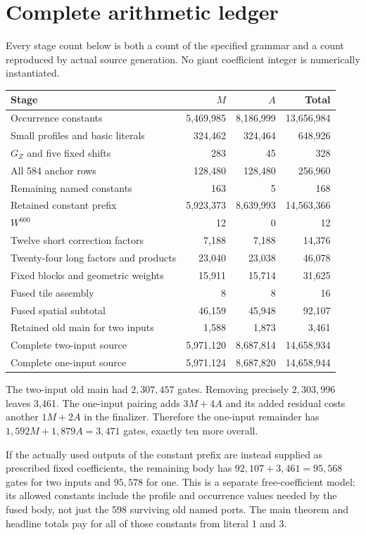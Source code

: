 \documentclass[11pt,letterpaper]{article}
\theoremstyle{definition}\newtheorem{definition}[theorem]{Definition}
\theoremstyle{remark}\newtheorem{remark}[theorem]{Remark}
\begin{document}
\section{Complete arithmetic ledger}\label{ptr:fu:sec:ledger}
Every stage count below is both a count of the specified grammar and a count reproduced by actual source generation. No giant coefficient integer is numerically instantiated.
\begingroup\small
\begin{longtable}{@{}lrrr@{}}\toprule
Stage&$M$&$A$&Total\\\midrule\endhead
Occurrence constants&5,469,985&8,186,999&13,656,984\\
Small profiles and basic literals&324,462&324,464&648,926\\
$G_Z$ and five fixed shifts&283&45&328\\
All 584 anchor rows&128,480&128,480&256,960\\
Remaining named constants&163&5&168\\\midrule
Retained constant prefix&5,923,373&8,639,993&14,563,366\\\midrule
$W^{600}$&12&0&12\\
Twelve short correction factors&7,188&7,188&14,376\\
Twenty-four long factors and products&23,040&23,038&46,078\\
Fixed blocks and geometric weights&15,911&15,714&31,625\\
Fused tile assembly&8&8&16\\\midrule
Fused spatial subtotal&46,159&45,948&92,107\\\midrule
Retained old main for two inputs&1,588&1,873&3,461\\\midrule
Complete two-input source&5,971,120&8,687,814&14,658,934\\
Complete one-input source&5,971,124&8,687,820&14,658,944\\\bottomrule
\end{longtable}\endgroup
The two-input old main had $2,307,457$ gates. Removing precisely $2,303,996$ leaves 3,461. The one-input pairing adds $3M+4A$ and its added residual costs another $1M+2A$ in the finalizer. Therefore the one-input remainder has $1,592M+1,879A=3,471$ gates, exactly ten more overall.

If the actually used outputs of the constant prefix are instead supplied as prescribed fixed coefficients, the remaining body has $92,107+3,461=95,568$ gates for two inputs and $95,578$ for one. This is a separate free-coefficient model: its allowed constants include the profile and occurrence values needed by the fused body, not just the 598 surviving old named ports. The main theorem and headline totals pay for all of those constants from literal 1 and 3.
\end{document}

